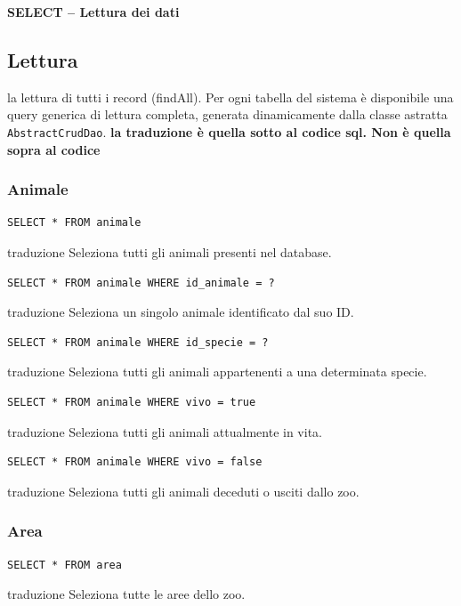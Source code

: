 \documentclass[12pt,a4paper]{report}
\begin{document}
\textbf{SELECT -- Lettura dei dati}

\subsection{Lettura}
la lettura  di tutti i record (findAll).
Per ogni tabella del sistema è disponibile una query generica di lettura completa, generata dinamicamente dalla classe astratta \texttt{AbstractCrudDao}.
\textbf{la traduzione è quella sotto al codice sql. Non è quella sopra al codice}

\subsubsection*{Animale}
\begin{lstlisting}[style=sqlstyle]
SELECT * FROM animale
\end{lstlisting}
traduzione {Seleziona tutti gli animali presenti nel database.}

\begin{lstlisting}[style=sqlstyle]
SELECT * FROM animale WHERE id_animale = ?
\end{lstlisting}
traduzione {Seleziona un singolo animale identificato dal suo ID.}

\begin{lstlisting}[style=sqlstyle]
SELECT * FROM animale WHERE id_specie = ?
\end{lstlisting}
traduzione {Seleziona tutti gli animali appartenenti a una determinata specie.}

\begin{lstlisting}[style=sqlstyle]
SELECT * FROM animale WHERE vivo = true
\end{lstlisting}
traduzione {Seleziona tutti gli animali attualmente in vita.}

\begin{lstlisting}[style=sqlstyle]
SELECT * FROM animale WHERE vivo = false
\end{lstlisting}
traduzione {Seleziona tutti gli animali deceduti o usciti dallo zoo.}

\subsubsection*{Area}
\begin{lstlisting}[style=sqlstyle]
SELECT * FROM area
\end{lstlisting}
traduzione {Seleziona tutte le aree dello zoo.}
\end{document}

